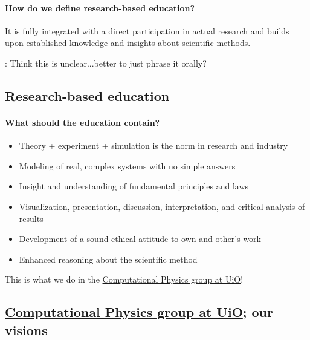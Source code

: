 \documentclass[%
oneside,                 %
final,                   %
10pt]{article}
\newcommand{\shortinlinecomment}[3]{{\color{red}{\bf #1}: #2}}
\begin{document}
\paragraph{How do we define research-based education?}
It is fully integrated with a direct participation in actual research and builds upon established
knowledge and insights about scientific methods.

\shortinlinecomment{hpl 1}{ Think this is unclear...better to just phrase it orally? }{ Think this is unclear...better }





\subsection{Research-based education}


\paragraph{What should the education contain?}

\begin{itemize}
\item Theory + experiment + simulation is the norm in research and industry

\item Modeling of real, complex systems with no simple answers

\item Insight and understanding of fundamental principles and laws

\item Visualization, presentation, discussion, interpretation, and critical analysis of results

\item Development of a sound ethical attitude to own and other's work

\item Enhanced reasoning about the scientific method
\end{itemize}

\noindent
This is what we do in the \href{{http://www.mn.uio.no/fysikk/english/research/groups/computational/index.html}}{Computational Physics group at UiO}!




\subsection{\href{{http://www.mn.uio.no/fysikk/english/research/groups/computational/index.html}}{Computational Physics group at UiO}; our visions}
\end{document}
